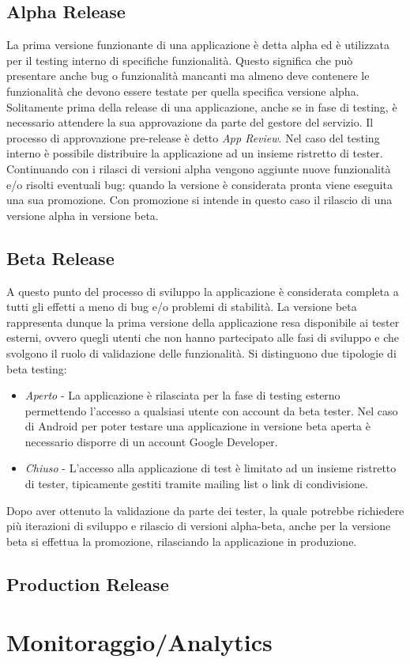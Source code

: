 \subsection{Alpha Release}
La prima versione funzionante di una applicazione è detta alpha ed è utilizzata per il testing interno di specifiche funzionalità. Questo significa che può presentare anche bug o funzionalità mancanti ma almeno deve contenere le funzionalità che devono essere testate per quella specifica versione alpha. \\
Solitamente prima della release di una applicazione, anche se in fase di testing, è necessario attendere la sua approvazione da parte del gestore del servizio. Il processo di approvazione pre-release è detto \textit{App Review}. Nel caso del testing interno è possibile distribuire la applicazione ad un insieme ristretto di tester.\\
Continuando con i rilasci di versioni alpha vengono aggiunte nuove funzionalità e/o risolti eventuali bug: quando la versione è considerata pronta viene eseguita una sua promozione. Con promozione si intende in questo caso il rilascio di una versione alpha in versione beta.

\subsection{Beta Release}
A questo punto del processo di sviluppo la applicazione è considerata completa a tutti gli effetti a meno di bug e/o problemi di stabilità. La versione beta rappresenta dunque la prima versione della applicazione resa disponibile ai tester esterni, ovvero quegli utenti che non hanno partecipato alle fasi di sviluppo e che svolgono il ruolo di validazione delle funzionalità. Si distinguono due tipologie di beta testing:
\begin{itemize}
    \item \textit{Aperto} - La applicazione è rilasciata per la fase di testing esterno permettendo l'accesso a qualsiasi utente con account da beta tester. Nel caso di Android per poter testare una applicazione in versione beta aperta è necessario disporre di un account Google Developer.
    \item \textit{Chiuso} - L'accesso alla applicazione di test è limitato ad un insieme ristretto di tester, tipicamente gestiti tramite mailing list o link di condivisione.
\end{itemize}
Dopo aver ottenuto la validazione da parte dei tester, la quale potrebbe richiedere più iterazioni di sviluppo e rilascio di versioni alpha-beta, anche per la versione beta si effettua la promozione, rilasciando la applicazione in produzione.

\subsection{Production Release}



\section{Monitoraggio/Analytics}
